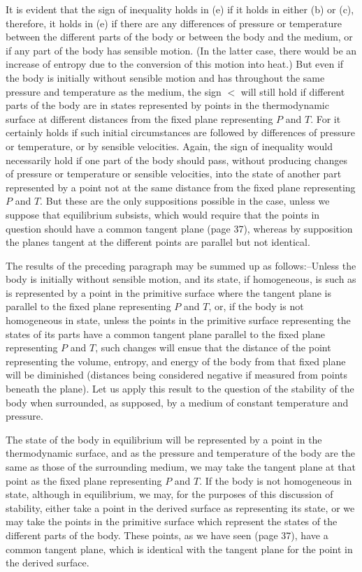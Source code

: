 \documentclass[11pt]{article}
\begin{document}
It is evident that the sign of inequality holds in (e) if it holds in either (b) or (c), therefore, it holds in (e) if there are any differences of pressure or temperature between the different parts of the body or between the body and the medium, or if any part of the body has sensible motion. (In the latter case, there would be an increase of entropy due to the conversion of this motion into heat.) But even if the body is initially without sensible motion and has throughout the same pressure and temperature as the medium, the sign $<$ will still hold if different parts of the body are in states represented by points in the thermodynamic surface at different distances from the fixed plane representing $P$ and $T$. For it certainly holds if such initial circumstances are followed by differences of pressure or temperature, or by sensible velocities. Again, the sign of inequality would necessarily hold if one part of the body should pass, without producing changes of pressure or temperature or sensible velocities, into the state of another part represented by a point not at the same distance from the fixed plane representing $P$ and $T$. But these are the only suppositions possible in the case, unless we suppose that equilibrium subsists, which would require that the points in question should have a common tangent plane (page 37), whereas by supposition the planes tangent at the different points are parallel but not identical.

The results of the preceding paragraph may be summed up as follows:--Unless the body is initially without sensible motion, and its state, if homogeneous, is such as is represented by a point in the primitive surface where the tangent plane is parallel to the fixed plane representing $P$ and $T$, or, if the body is not homogeneous in state, unless the points in the primitive surface representing the states of its parts have a common tangent plane parallel to the fixed plane representing $P$ and $T$, such changes will ensue that the distance of the point representing the volume, entropy, and energy of the body from that fixed plane will be diminished (distances being considered negative if measured from points beneath the plane). Let us apply this result to the question of the stability of the body when surrounded, as supposed, by a medium of constant temperature and pressure.

The state of the body in equilibrium will be represented by a point in the thermodynamic surface, and as the pressure and temperature of the body are the same as those of the surrounding medium, we may take the tangent plane at that point as the fixed plane representing $P$ and $T$. If the body is not homogeneous in state, although in equilibrium, we may, for the purposes of this discussion of stability, either take a point in the derived surface as representing its state, or we may take the points in the primitive surface which represent the states of the different parts of the body. These points, as we have seen (page 37), have a common tangent plane, which is identical with the tangent plane for the point in the derived surface.
\end{document}
